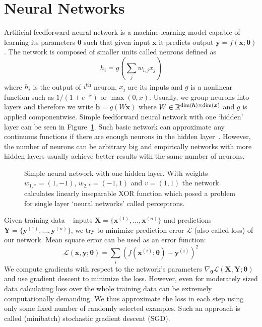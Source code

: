 \section{Neural Networks}
Artificial feedforward neural network is a machine learning model capable of learning its parameters $\bm{\theta}$ such that given input $\bm{x}$ it predicts output $\bm{y}=f(\bm{x};\bm{\theta})$. The network is composed of smaller units called neurons defined as
\begin{equation*}
h_i=g\left(\sum_{j}w_{i,j}x_j\right)
\end{equation*}
where $h_i$ is the output of $i$\textsuperscript{th} neuron, $x_j$ are its inputs and $g$ is a nonlinear function such as $1/(1+e^{-x})$ or $\max(0, x)$. Usually, we group neurons into layers and therefore we write $\bm{h}=g(W\bm{x})$ where $W\in\mathbb{R}^{\dim(\bm{h})\times\dim(\bm{x})}$ and $g$ is applied componentwise. Simple feedforward neural network with one `hidden' layer can be seen in Figure~\ref{fig:basic_nn}. Such basic network can approximate any continuous functions if there are enough neurons in the hidden layer~\cite{HORNIK}. However, the number of neurons can be arbitrary big and empirically networks with more hidden layers usually achieve better results with the same number of neurons.

\begin{figure}
	\centering
	
	
	\caption[Simple neural network]{Simple neural network with one hidden layer. With weights $w_{1,*} = (1,-1)$, $w_{2,*} = (-1,1)$ and  $v = (1,1)$ the network calculates linearly inseparable \textsf{XOR} function which posed a problem for single layer `neural networks' called perceptrons.}
	\label{fig:basic_nn}
\end{figure}

Given training data -- inputs $\bm{X}=\{\bm{x}^{(1)},\dots,\bm{x}^{(n)}\}$ and predictions $\bm{Y}=\{\bm{y}^{(1)},\dots,\bm{y}^{(n)}\}$, we try to minimize prediction error $\mathcal{L}$ (also called loss) of our network. Mean square error can be used as an error function:
\begin{equation*}
\mathcal{L}(\bm{x},\bm{y};\bm{\theta})=\sum_i\left(f(\bm{x}^{(i)};\bm{\theta})-\bm{y}^{(i)}\right)^2
\end{equation*}
We compute gradients with respect to the network's parameters $\nabla_{\bm{\theta}}\mathcal{L}(\bm{X},\bm{Y};\bm{\theta})$ and use gradient descent to minimize the loss. However, even for moderately sized data calculating loss over the whole training data can be extremely computationally demanding. We thus approximate the loss in each step using only some fixed number of randomly selected examples. Such an approach is called (minibatch) stochastic gradient descent (SGD).

